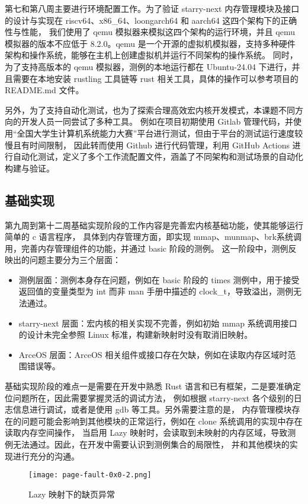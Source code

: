 第七和第八周主要进行环境配置工作。为了验证 starry-next 内存管理模块及接口的设计与实现在 riscv64、x86\_64、loongarch64 和 aarch64 这四个架构下的正确性与性能，
我们使用了 qemu 模拟器来模拟这四个架构的运行环境，并且 qemu 模拟器的版本不应低于 8.2.0。qemu 是一个开源的虚拟机模拟器，支持多种硬件架构和操作系统，能够在主机上创建虚拟机并运行不同架构的操作系统。
同时，为了支持高版本的 qemu 模拟器，测例的本地运行都在 Ubuntu-24.04 下进行，并且需要在本地安装 rustling 工具链等 rust 相关工具，具体的操作可以参考项目的 README.md 文件。

另外，为了支持自动化测试，也为了探索合理高效宏内核开发模式，本课题不同方向的开发人员一同尝试了多种工具。
例如在项目初期使用 Gitlab 管理代码，并使用“全国大学生计算机系统能力大赛”平台进行测试，但由于平台的测试运行速度较慢且有时间限制，
因此转而使用 Github 进行代码管理，利用 GitHub Actions 进行自动化测试，定义了多个工作流配置文件，涵盖了不同架构和测试场景的自动化构建与验证。

\subsection{基础实现}

第九周到第十二周基础实现阶段的工作内容是完善宏内核基础功能，使其能够运行简单的 c 语言程序，
具体到内存管理方面，即实现 mmap、munmap、brk系统调用，完善内存管理组件的功能，并通过 basic 阶段的测例。
这一阶段中，测例反映出的问题主要分为三个层面：
\begin{itemize}
    \item 测例层面：测例本身存在问题，例如在 basic 阶段的 times 测例中，用于接受返回值的变量类型为 int 而非 man 手册中描述的 clock\_t，导致溢出，测例无法通过。
    \item starry-next 层面：宏内核的相关实现不完善，例如初始 mmap 系统调用接口的设计未完全参照 Linux 标准，构建新映射时没有取消旧映射。
    \item ArceOS 层面：ArceOS 相关组件或接口存在欠缺，例如在读取内存区域时范围错误等。
\end{itemize}

基础实现阶段的难点一是需要在开发中熟悉 Rust 语言和已有框架，二是要准确定位问题所在，因此需要掌握灵活的调试方法，
例如根据 starry-next 各个级别的日志信息进行调试，或者是使用 gdb 等工具。另外需要注意的是，
内存管理模块存在的问题可能会影响到其他模块的正常运行，例如在 clone 系统调用的实现中存在读取内存空间操作，
当启用 Lazy 映射时，会读取到未映射的内存区域，导致测例无法通过。因此，在开发中需要认识到测例集合的局限性，
并和其他模块的实现进行充分的沟通。

\begin{figure}
    \centering
    \texttt{[image: page-fault-0x0-2.png]}
    \caption{Lazy 映射下的缺页异常}
    \label{fig:page-fault-0x0}
\end{figure}

